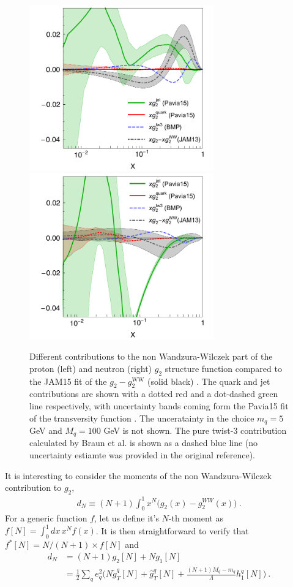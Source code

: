\documentclass[preprintnumbers,floatfix,nofootinbib]{revtex4}
\begin{document}
\begin{figure}[tbh]
\begin{center}
\includegraphics[width=8cm]{g2contrib}
\includegraphics[width=8cm]{g2contribN}
\caption{\label{f:g2contrib} 
Different contributions to the non Wandzura-Wilczek part of the proton (left)
and neutron (right) $g_2$ structure function compared to the JAM15 fit of the
$g_2-g_2^{\text{WW}}$ (solid black) \cite{Sato:2016tuz}. The quark and jet
contributions are shown with a dotted red and a dot-dashed green line
respectively, with uncertainty bands coming form the Pavia15 fit of the
transversity function \cite{Radici:2015mwa}. The unceratainty in the choice
$m_q=5$ GeV and $M_q=100$ GeV is not shown. The pure twist-3 contribution
calculated by Braun et al. \cite{Braun:2011aw} is shown as a dashed blue line
(no uncertainty estiamte was provided in the original reference). 
}
\end{center}
\end{figure}

It is interesting to consider the moments of the non Wandzura-Wilczek contribution to $g_2$,
\begin{align}
  d_N \equiv (N+1) \int_0^1 x^N \bigg( g_2(x) - g_2^{WW}(x) \bigg) \ .
\end{align}
For a generic function $f$, let us define it's $N$-th moment as $f[N]=\int_0^1 dx\, x^{N} f(x)$. It is then straightforward to verify that $f^*[N] = N/(N+1) \times f[N]$ and  
\begin{align}
  d_N & = (N+1) g_2[N] + N g_1[N] \\
  & = \frac12 \sum_q e_q^2 \bigg( N \tilde g_T^q[N] + \hat g_T^q[N]
    + \frac{(N+1) M_q-m_q}{\Lambda} h_1^q[N] \bigg) \ .
\end{align}
\end{document}
